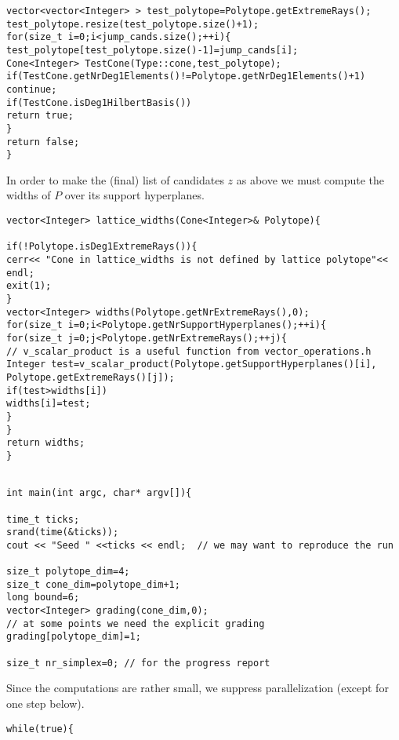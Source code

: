 \documentclass[12pt,a4paper]{scrartcl}
\theoremstyle{definition}
\begin{document}
\begin{small}
\begin{Verbatim}
vector<vector<Integer> > test_polytope=Polytope.getExtremeRays();
test_polytope.resize(test_polytope.size()+1); 
for(size_t i=0;i<jump_cands.size();++i){
test_polytope[test_polytope.size()-1]=jump_cands[i];
Cone<Integer> TestCone(Type::cone,test_polytope);
if(TestCone.getNrDeg1Elements()!=Polytope.getNrDeg1Elements()+1)
continue;
if(TestCone.isDeg1HilbertBasis())
return true;        
}    
return false;    
}
\end{Verbatim}

In order to make the (final) list of candidates $z$ as above we must compute the widths of $P$ over its support hyperplanes.
\begin{Verbatim}
vector<Integer> lattice_widths(Cone<Integer>& Polytope){

if(!Polytope.isDeg1ExtremeRays()){
cerr<< "Cone in lattice_widths is not defined by lattice polytope"<< endl;
exit(1);
}
vector<Integer> widths(Polytope.getNrExtremeRays(),0);
for(size_t i=0;i<Polytope.getNrSupportHyperplanes();++i){
for(size_t j=0;j<Polytope.getNrExtremeRays();++j){
// v_scalar_product is a useful function from vector_operations.h
Integer test=v_scalar_product(Polytope.getSupportHyperplanes()[i],
Polytope.getExtremeRays()[j]);
if(test>widths[i])
widths[i]=test;
}
}
return widths;    
}
\end{Verbatim}

\begin{Verbatim}

int main(int argc, char* argv[]){

time_t ticks;
srand(time(&ticks));
cout << "Seed " <<ticks << endl;  // we may want to reproduce the run

size_t polytope_dim=4;
size_t cone_dim=polytope_dim+1;
long bound=6;
vector<Integer> grading(cone_dim,0); 
// at some points we need the explicit grading
grading[polytope_dim]=1;

size_t nr_simplex=0; // for the progress report

\end{Verbatim}
Since the computations are rather small, we suppress parallelization (except for one step below).
\begin{Verbatim}	
while(true){


\end{Verbatim}
\end{small}
\end{document}

